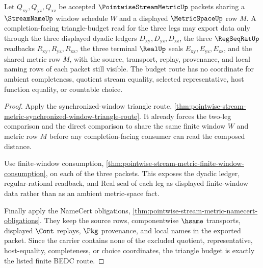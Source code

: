 \begin{theorem}
\label{thm:pointwise-stream-metric-finite-window-triangle-budget}
Let $Q_{\mathrm{xy}},Q_{\mathrm{yz}},Q_{\mathrm{xz}}$ be accepted $\PointwiseStreamMetricUp$ packets sharing a $\StreamNameUp$ window schedule $W$ and a displayed $\MetricSpaceUp$ row $M$. A completion-facing triangle-budget read for the three legs may export data only through the three displayed dyadic ledgers $D_{\mathrm{xy}},D_{\mathrm{yz}},D_{\mathrm{xz}}$, the three $\RegSeqRatUp$ readbacks $R_{\mathrm{xy}},R_{\mathrm{yz}},R_{\mathrm{xz}}$, the three terminal $\RealUp$ seals $E_{\mathrm{xy}},E_{\mathrm{yz}},E_{\mathrm{xz}}$, and the shared metric row $M$, with the source, transport, replay, provenance, and local naming rows of each packet still visible. The budget route has no coordinate for ambient completeness, quotient stream equality, selected representative, host function equality, or countable choice.
\end{theorem}
\begin{proof}
Apply the synchronized-window triangle route, \autoref{thm:pointwise-stream-metric-synchronized-window-triangle-route}. It already forces the two-leg comparison and the direct comparison to share the same finite window $W$ and metric row $M$ before any completion-facing consumer can read the composed distance.

Use finite-window consumption, \autoref{thm:pointwise-stream-metric-finite-window-consumption}, on each of the three packets. This exposes the dyadic ledger, regular-rational readback, and Real seal of each leg as displayed finite-window data rather than as an ambient metric-space fact.

Finally apply the NameCert obligations, \autoref{thm:pointwise-stream-metric-namecert-obligations}. They keep the source rows, componentwise $\hsame$ transports, displayed $\Cont$ replays, $\Pkg$ provenance, and local names in the exported packet. Since the carrier contains none of the excluded quotient, representative, host-equality, completeness, or choice coordinates, the triangle budget is exactly the listed finite BEDC route.
\end{proof}

